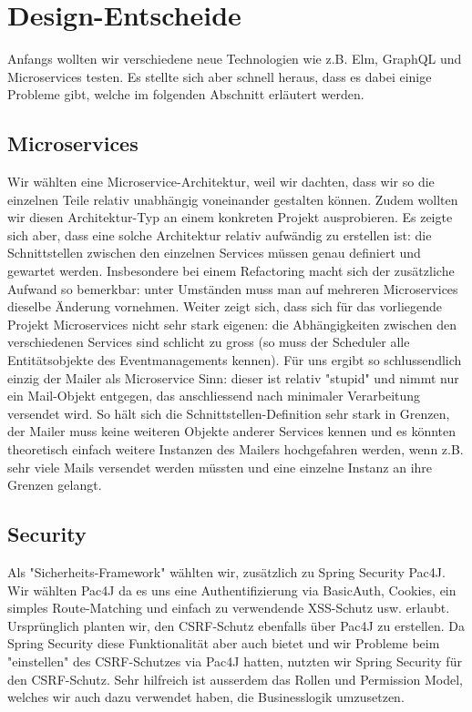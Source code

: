 \documentclass[11pt]{article} %
\begin{document}
\newpage
\section{Design-Entscheide}
Anfangs wollten wir verschiedene neue Technologien wie z.B. Elm, GraphQL und Microservices testen. Es stellte sich aber schnell heraus, dass es dabei einige Probleme gibt, welche im folgenden Abschnitt erläutert werden.

\subsection{Microservices}
Wir wählten eine Microservice-Architektur, weil wir dachten, dass wir so die einzelnen Teile relativ unabhängig voneinander gestalten können. Zudem wollten wir diesen Architektur-Typ an einem konkreten Projekt ausprobieren. Es zeigte sich aber, dass eine solche Architektur relativ aufwändig zu erstellen ist: die Schnittstellen zwischen den einzelnen Services müssen genau definiert und gewartet werden. Insbesondere bei einem Refactoring macht sich der zusätzliche Aufwand so bemerkbar: unter Umständen muss man auf mehreren Microservices dieselbe Änderung vornehmen. Weiter zeigt sich, dass sich für das vorliegende Projekt Microservices nicht sehr stark eigenen: die Abhängigkeiten zwischen den verschiedenen Services sind schlicht zu gross (so muss der Scheduler alle Entitätsobjekte des Eventmanagements kennen). Für uns ergibt so schlussendlich einzig der Mailer als Microservice Sinn: dieser ist relativ "stupid" und nimmt nur ein Mail-Objekt entgegen, das anschliessend nach minimaler Verarbeitung versendet wird. So hält sich die Schnittstellen-Definition sehr stark in Grenzen, der Mailer muss keine weiteren Objekte anderer Services kennen und es könnten theoretisch einfach weitere Instanzen des Mailers hochgefahren werden, wenn z.B. sehr viele Mails versendet werden müssten und eine einzelne Instanz an ihre Grenzen gelangt.

\subsection{Security}
Als "Sicherheits-Framework" wählten wir, zusätzlich zu Spring Security Pac4J. Wir wählten Pac4J da es uns eine Authentifizierung via BasicAuth, Cookies, ein simples Route-Matching und einfach zu verwendende XSS-Schutz usw. erlaubt. Ursprünglich planten wir, den CSRF-Schutz ebenfalls über Pac4J zu erstellen. Da Spring Security diese Funktionalität aber auch bietet und wir Probleme beim "einstellen" des CSRF-Schutzes via Pac4J hatten, nutzten wir Spring Security für den CSRF-Schutz. Sehr hilfreich ist ausserdem das Rollen und Permission Model, welches wir auch dazu verwendet haben, die Businesslogik umzusetzen.
\end{document}
